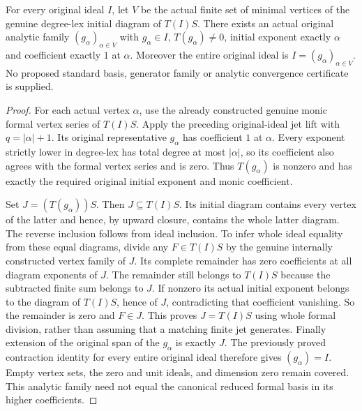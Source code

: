\begin{theorem}
\label{hir:actual-original-analytic-monic-vertex-basis}
\leanok
For every original ideal $I$, let $V$ be the actual finite set of minimal
vertices of the genuine degree-lex initial diagram of $T(I)S$.
There exists an actual original analytic family $(g_\alpha)_{\alpha\in V}$
with $g_\alpha\in I$, $T(g_\alpha)\ne0$, initial exponent exactly $\alpha$
and coefficient exactly $1$ at $\alpha$. Moreover the entire original ideal
is $I=(g_\alpha)_{\alpha\in V}$. No proposed standard basis, generator
family or analytic convergence certificate is supplied.
\end{theorem}
\begin{proof}
For each actual vertex $\alpha$, use the already constructed genuine monic
formal vertex series of $T(I)S$. Apply the preceding original-ideal jet lift
with $q=|\alpha|+1$. Its original representative $g_\alpha$ has coefficient
$1$ at $\alpha$. Every exponent strictly lower in degree-lex has total
degree at most $|\alpha|$, so its coefficient also agrees with the formal
vertex series and is zero. Thus $T(g_\alpha)$ is nonzero and has exactly
the required original initial exponent and monic coefficient.

Set $J=(T(g_\alpha))S$. Then $J\subseteq T(I)S$. Its initial diagram
contains every vertex of the latter and hence, by upward closure, contains
the whole latter diagram. The reverse inclusion follows from ideal inclusion.
To infer whole ideal equality from these equal diagrams, divide any
$F\in T(I)S$ by the genuine internally constructed vertex family of $J$.
Its complete remainder has zero coefficients at all diagram exponents of
$J$. The remainder still belongs to $T(I)S$ because the subtracted finite
sum belongs to $J$. If nonzero its actual initial exponent belongs to the
diagram of $T(I)S$, hence of $J$, contradicting that coefficient vanishing.
So the remainder is zero and $F\in J$. This proves $J=T(I)S$ using whole
formal division, rather than assuming that a matching finite jet generates.
Finally extension of the original span of the $g_\alpha$ is exactly $J$.
The previously proved contraction identity for every entire original ideal
therefore gives $(g_\alpha)=I$. Empty vertex sets, the zero and unit ideals,
and dimension zero remain covered. This analytic family need not equal the
canonical reduced formal basis in its higher coefficients.
\end{proof}
